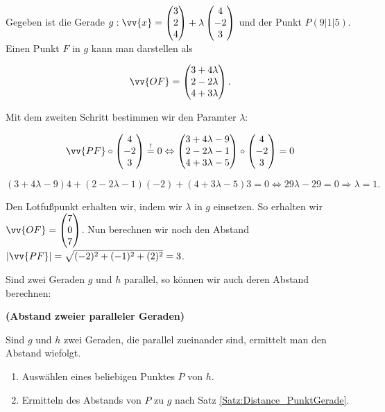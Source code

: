\documentclass[ngerman, 12pt]{nssheetxea}
\begin{document}
\begin{example}
Gegeben ist die Gerade $g:\vv{x}= \colvec[3]{2}{4}+\lambda \colvec[4]{-2}{3}$ und der Punkt $P(9|1|5)$. Einen Punkt $F$ in $g$ kann man darstellen als


\[
\vv{OF}=\colvec[3+4\lambda]{2-2\lambda}{4+3\lambda}.
\]


Mit dem zweiten Schritt bestimmen wir den Paramter $\lambda$:


\[
\vv{PF} \circ \colvec[4]{-2}{3} \stackrel{!}{=} 0 \Leftrightarrow  
\colvec[3+4\lambda - 9]{2-2\lambda - 1}{4+3\lambda - 5}\circ \colvec[4]{-2}{3} = 0
\]




\[
(3+4\lambda-9)4+(2-2\lambda - 1)(-2)+(4+3\lambda -5)3 = 0 
\Leftrightarrow 29 \lambda - 29 = 0 \Rightarrow \lambda = 1.
\]

Den Lotfußpunkt erhalten wir, indem wir $\lambda$ in $g$ einsetzen. So erhalten wir $\vv{OF}=\colvec[7]{0}{7}$. Nun berechnen wir noch den Abstand $|\vv{PF}|=\sqrt{(-2)^2+(-1)^2+(2)^2} = 3$.
\end{example}

Sind zwei Geraden $g$ und $h$ parallel, so können wir auch deren Abstand berechnen:


\begin{theorem} \textbf{(Abstand zweier paralleler Geraden)} \par
Sind $g$ und $h$ zwei Geraden, die parallel zueinander sind, ermittelt man den Abstand wiefolgt.
\begin{enumerate}
\item Auswählen eines beliebigen Punktes $P$ von $h$.
\item Ermitteln des Abstands von $P$ zu $g$ nach Satz \ref{Satz:Distance_PunktGerade}.
\end{enumerate}
\end{theorem}
\end{document}
